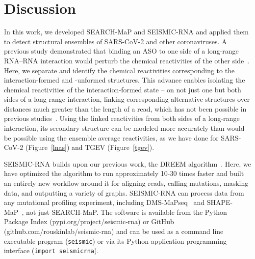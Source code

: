 \documentclass[main.tex]{subfiles}
\begin{document}
\section{Discussion}

In this work, we developed SEARCH-MaP and SEISMIC-RNA and applied them to detect structural ensembles of SARS-CoV-2 and other coronaviruses.
A previous study demonstrated that binding an ASO to one side of a long-range RNA--RNA interaction would perturb the chemical reactivities of the other side~\cite{Archer2013}.
Here, we separate and identify the chemical reactivities corresponding to the interaction-formed and -unformed structures.
This advance enables isolating the chemical reactivities of the interaction-formed state -- on not just one but both sides of a long-range interaction, linking corresponding alternative structures over distances much greater than the length of a read, which has not been possible in previous studies~\cite{Tomezsko2020,Morandi2021}.
Using the linked reactivities from both sides of a long-range interaction, its secondary structure can be modeled more accurately than would be possible using the ensemble average reactivities, as we have done for SARS-CoV-2 (Figure~\ref{lnas}) and TGEV (Figure~\ref{tgev}).

SEISMIC-RNA builds upon our previous work, the DREEM algorithm~\cite{Tomezsko2020}.
Here, we have optimized the algorithm to run approximately 10-30 times faster and built an entirely new workflow around it for aligning reads, calling mutations, masking data, and outputting a variety of graphs.
SEISMIC-RNA can process data from any mutational profiling experiment, including DMS-MaPseq~\cite{Zubradt2016} and SHAPE-MaP~\cite{Siegfried2014}, not just SEARCH-MaP.
The software is available from the Python Package Index (pypi.org/project/seismic-rna) or GitHub (github.com/rouskinlab/seismic-rna) and can be used as a command line executable program (\verb|seismic|) or via its Python application programming interface (\verb|import seismicrna|).
\end{document}
